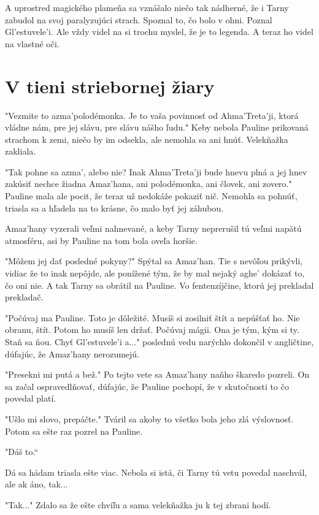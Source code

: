 \documentclass{book}
\begin{document}
A uprostred magického plameňa sa vznášalo niečo tak nádherné, že i Tarny zabudol na svoj paralyzujúci strach. Spoznal to, čo bolo v ohni. Poznal Gl'estuvele'i. Ale vždy videl na si trochu myslel, že je to legenda. A teraz ho videl na vlastné oči.


\chapter{V tieni striebornej žiary}

"$ $Vezmite to azma'polodémonka. Je to vaša povinnosť od Ahma'Treta'ji, ktorá vládne nám, pre jej slávu, pre slávu nášho ľudu."$ $ Keby nebola Pauline prikovaná strachom k zemi, niečo by im odsekla, ale nemohla sa ani hnúť. Velekňažka zakliala.

"$ $Tak pohne sa azma', alebo nie? Inak Ahma'Treta'ji bude hnevu plná a jej hnev zakúsiť nechce žiadna Amaz'hana, ani polodémonka, ani človek, ani zovero."$ $ Pauline mala ale pocit, že teraz už nedokáže pokaziť nič. Nemohla sa pohnúť, triasla sa a hľadela na to krásne, čo malo byť jej záhubou.

Amaz'hany vyzerali veľmi nahnevané, a keby Tarny neprerušil tú veľmi napätú atmosféru, asi by Pauline na tom bola oveľa horšie.

"$ $Môžem jej dať posledné pokyny?"$ $ Spýtal sa Amaz'han. Tie s nevôľou prikývli, vidiac že to inak nepôjde, ale ponížené tým, že by mal nejaký aghe' dokázať to, čo oni nie. A tak Tarny sa obrátil na Pauline. Vo fentenzíjčine, ktorú jej prekladal prekladač.

"$ $Počúvaj ma Pauline. Toto je dôležité. Musíš si zosilniť štít a nepúšťať ho. Nie obranu, štít. Potom ho musíš len držať. Počúvaj mágii. Ona je tým, kým si ty. Staň sa ňou. Chyť Gl'estuvele'i a..."$ $ poslednú vedu narýchlo dokončil v angličtine, dúfajúc, že Amaz'hany nerozumejú.

"$ $Presekni mi putá a bež."$ $ Po tejto vete sa Amaz'hany naňho škaredo pozreli. On sa začal ospravedlňovať, dúfajúc, že Pauline pochopí, že v skutočnosti to čo povedal platí.

"$ $Ušlo mi slovo, prepáčte."$ $ Tváril sa akoby to všetko bola jeho zlá výslovnosť. Potom sa ešte raz pozrel na Pauline.

"$ $Dáš to.“

Dá sa hádam triasla ešte viac. Nebola si istá, či Tarny tú vetu povedal naschvál, ale ak áno, tak...

"$ $Tak..."$ $ Zdalo sa že ešte chvíľu a sama velekňažka ju k tej zbrani hodí.
\end{document}
